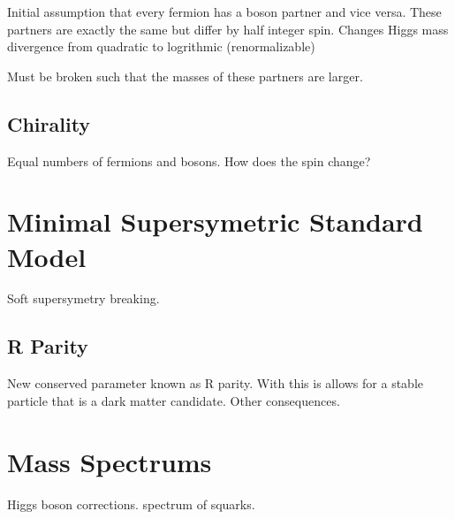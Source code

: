 Initial assumption that every fermion has a boson partner and vice versa. These partners are exactly the same but differ by half integer spin. Changes Higgs mass divergence from quadratic to logrithmic (renormalizable)

Must be broken such that the masses of these partners are larger.

\subsection{Chirality}
\label{subsec:chiral}

Equal numbers of fermions and bosons. How does the spin change? 

\section{Minimal Supersymetric Standard Model}
\label{sec:MSSM}

Soft supersymetry breaking. 

\subsection{R Parity}
\label{subsec:rparity}

New conserved parameter known as R parity. With this is allows for a stable particle that is a dark matter candidate. Other consequences.

\section{Mass Spectrums}

Higgs boson corrections. spectrum of squarks. 






